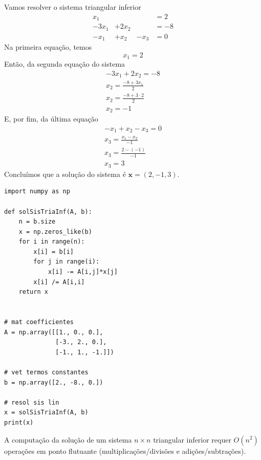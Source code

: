 \begin{ex}
  Vamos resolver o sistema triangular inferior
  \begin{equation}
    \begin{matrix}
      x_1 &&&= 2\\
      -3x_1 &+ 2x_2 &&= -8\\
      -x_1 &+ x_2 &- x_3 &= 0
    \end{matrix}
  \end{equation}
  Na primeira equação, temos
  \begin{equation}
    x_1 = 2
  \end{equation}
  Então, da segunda equação do sistema
  \begin{gather}
    -3x_1 + 2x_2 = -8\\
    x_2 = \frac{-8 + 3x_1}{2}\\
    x_2 = \frac{-8 + 3\cdot 2}{2}\\
    x_2 = -1
  \end{gather}
  E, por fim, da última equação
  \begin{gather}
    -x_1 + x_2 - x_3 = 0\\
    x_3 = \frac{x_1 - x_2}{-1}\\
    x_3 = \frac{2 - (-1)}{-1}\\
    x_3 = 3
  \end{gather}
  Concluímos que a solução do sistema é $\pmb{x} = (2, -1, 3)$.

\begin{lstlisting}[caption=solSisTriaInf.py, label=cap_sislin_sec_lu:cod:solSisTriaInf]
import numpy as np

def solSisTriaInf(A, b):
    n = b.size
    x = np.zeros_like(b)
    for i in range(n):
        x[i] = b[i]
        for j in range(i):
            x[i] -= A[i,j]*x[j]
        x[i] /= A[i,i]
    return x
    

# mat coefficientes
A = np.array([[1., 0., 0.],
              [-3., 2., 0.],
              [-1., 1., -1.]])

# vet termos constantes
b = np.array([2., -8., 0.])

# resol sis lin
x = solSisTriaInf(A, b)
print(x)
\end{lstlisting}
\end{ex}

\begin{obs}
  A computação da solução de um sistema $n\times n$ triangular inferior requer $O(n^2)$ operações em ponto flutuante (multiplicações/divisões e adições/subtrações).
\end{obs}

